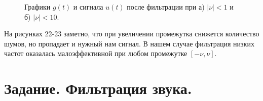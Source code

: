 \documentclass[a5paper, 10pt]{article}
\theoremstyle{definition}
\theoremstyle{plain}
\theoremstyle{remark}
\begin{document}
\begin{figure}[h!]
\begin{minipage}[h]{0.5\linewidth}
\end{minipage}
\hfill
\begin{minipage}[h]{0.5\linewidth}
\end{minipage}
\caption{Графики $g(t)$ и сигнала $u(t)$ после фильтрации при а) $|\nu| < 1$ и б) $|\nu| < 10$.}
\end{figure}

На рисунках 22-23 заметно, что при увеличении промежутка снижется количество шумов, но пропадает и нужный нам сигнал. В нашем случае фильтрация низких частот оказалась малоэффективной при любом промежутке $[-\nu, \nu]$.



\newpage
\section{Задание. Фильтрация звука.}



\end{document}
